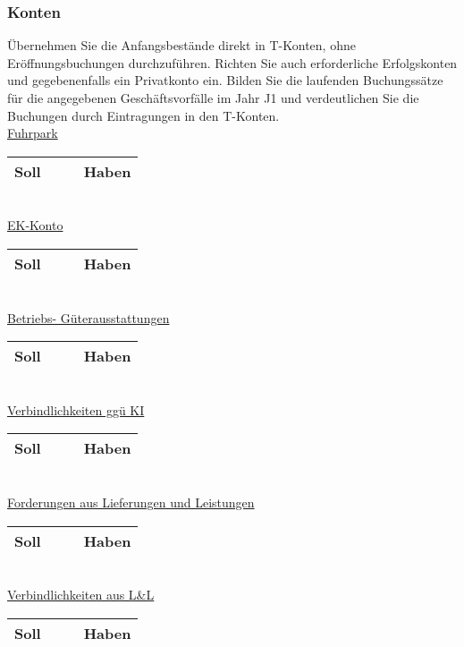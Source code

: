 \documentclass[paper=a4, fontsize=11pt]{scrartcl}
\numberwithin{equation}{section}
\numberwithin{figure}{section}
\numberwithin{table}{section}
\begin{document}
\subsubsection{Konten}
Übernehmen Sie die Anfangsbestände direkt in T-Konten, ohne Eröffnungsbuchungen durchzuführen. Richten Sie auch erforderliche Erfolgskonten und gegebenenfalls ein Privatkonto ein. Bilden Sie die laufenden Buchungssätze für die angegebenen Geschäftsvorfälle im Jahr J1 und verdeutlichen Sie die Buchungen durch Eintragungen in den T-Konten. \\

\underline{Fuhrpark}

\begin{tabular}{cc|cc}
\hline
Soll & & & Haben \\
\hline
\end{tabular}
\\

\underline{EK-Konto}

\begin{tabular}{cc|cc}
\hline
Soll & & & Haben \\
\hline
\end{tabular}
\\

\underline{Betriebs- Güterausstattungen}

\begin{tabular}{cc|cc}
\hline
Soll & & & Haben \\
\hline
\end{tabular}
\\

\underline{Verbindlichkeiten ggü KI}

\begin{tabular}{cc|cc}
\hline
Soll & & & Haben \\
\hline
\end{tabular}
\\

\underline{Forderungen aus Lieferungen und Leistungen}

\begin{tabular}{cc|cc}
\hline
Soll & & & Haben \\
\hline
\end{tabular}
\\

\underline{Verbindlichkeiten aus L&L}

\begin{tabular}{cc|cc}
\hline
Soll & & & Haben \\
\hline
\end{tabular}
\\
\end{document}
